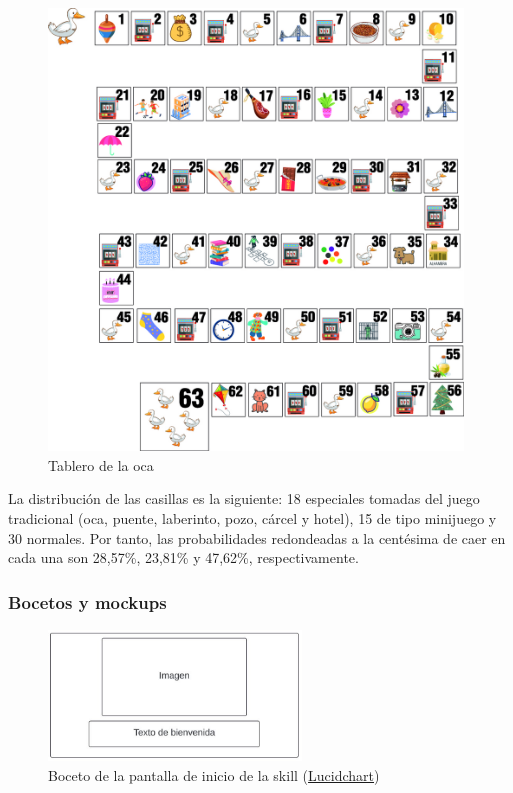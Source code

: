 \begin{figure}[H]
	\centering
	\includegraphics[width=0.98\textwidth]{imgs/tablero-oca.jpg}
	\caption{Tablero de la oca}
	\label{fig:tablero-oca}
\end{figure}
 
La distribución de las casillas es la siguiente: 18 especiales tomadas del juego tradicional (oca, puente, laberinto, pozo, cárcel y hotel), 15 de tipo minijuego y 30 normales. Por tanto, las probabilidades redondeadas a la centésima de caer en cada una son 28,57\%, 23,81\% y 47,62\%, respectivamente. 

\subsubsection{Bocetos y mockups}

\begin{figure}[H]
    \centering
    \includegraphics[width=0.6\textwidth]{imgs/boceto-bienvenida.JPG}
    \caption{Boceto de la pantalla de inicio de la skill (\href{https://www.lucidchart.com/pages/es}{Lucidchart})}
    \label{fig:boceto-bienvenida}
\end{figure}

